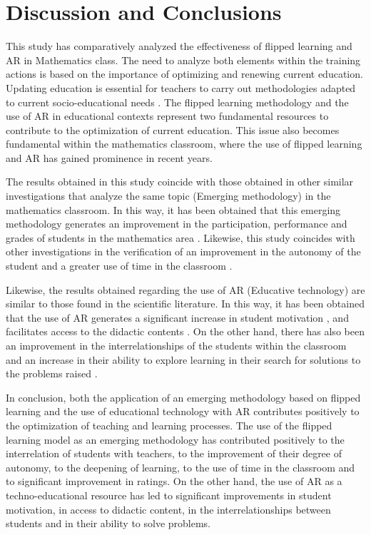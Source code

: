 \documentclass{textolivre}
\begin{document}
\section{Discussion and Conclusions}
This study has comparatively analyzed the effectiveness of flipped learning and AR in Mathematics class. The need to analyze both elements within the training actions is based on the importance of optimizing and renewing current education. Updating education is essential for teachers to carry out methodologies adapted to current socio-educational needs \cite{area2016, larionova2018, pereira2019}. The flipped learning methodology \cite{sanchez2019, zainuddin2019} and the use of AR in educational contexts \cite{cabero2019, lorenzo2018} represent two fundamental resources to contribute to the optimization of current education. This issue also becomes fundamental within the mathematics classroom, where the use of flipped learning \cite{adams2018, amstelveen2019} and AR \cite{cahyono2020} has gained prominence in recent years.

The results obtained in this study coincide with those obtained in other similar investigations that analyze the same topic (Emerging methodology) in the mathematics classroom. In this way, it has been obtained that this emerging methodology generates an improvement in the participation, performance and grades of students in the mathematics area \cite{adams2018, amstelveen2019, sun2018}. Likewise, this study coincides with other investigations in the verification of an improvement in the autonomy of the student \cite{salas2019, touron2015} and a greater use of time in the classroom \cite{longcummins2017}.

Likewise, the results obtained regarding the use of AR (Educative technology) are similar to those found in the scientific literature. In this way, it has been obtained that the use of AR generates a significant increase in student motivation \cite{caberollorentegutierrez2017}, and facilitates access to the didactic contents \cite{barroso2017, marincabero2018}. On the other hand, there has also been an improvement in the interrelationships of the students within the classroom \cite{caberollorentemarin2017} and an increase in their ability to explore learning in their search for solutions to the problems raised \cite{fombonavazquez2017}. 

In conclusion, both the application of an emerging methodology based on flipped learning and the use of educational technology with AR contributes positively to the optimization of teaching and learning processes. The use of the flipped learning model as an emerging methodology has contributed positively to the interrelation of students with teachers, to the improvement of their degree of autonomy, to the deepening of learning, to the use of time in the classroom and to significant improvement in ratings. On the other hand, the use of AR as a techno-educational resource has led to significant improvements in student motivation, in access to didactic content, in the interrelationships between students and in their ability to solve problems.
\end{document}

